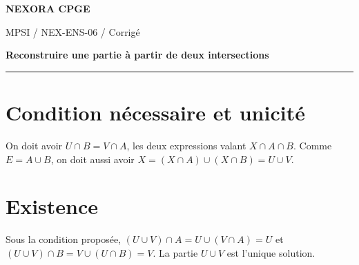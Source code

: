 \documentclass[11pt,a4paper]{article}
\begin{document}
{\small\bfseries\color{nexorablue} NEXORA CPGE}\par
{\small MPSI / NEX-ENS-06 / Corrigé}\par
{\LARGE\bfseries Reconstruire une partie à partir de deux intersections}\par
\vspace{0.25em}\hrule\vspace{0.6em}

\section*{Condition nécessaire et unicité}
On doit avoir $U\cap B=V\cap A$, les deux expressions valant $X\cap A\cap B$. Comme $E=A\cup B$, on doit aussi avoir $X=(X\cap A)\cup(X\cap B)=U\cup V$.

\section*{Existence}
Sous la condition proposée, $(U\cup V)\cap A=U\cup(V\cap A)=U$ et $(U\cup V)\cap B=V\cup(U\cap B)=V$. La partie $U\cup V$ est l’unique solution.
\end{document}
